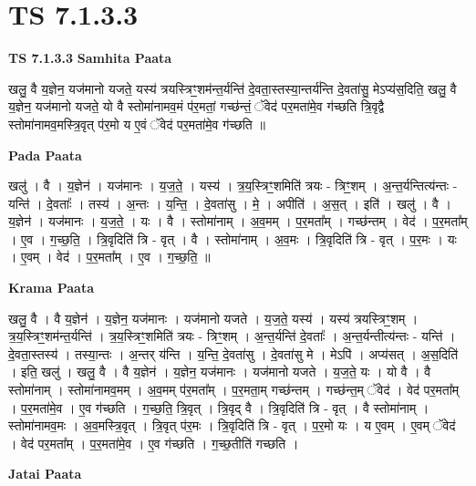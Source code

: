 \documentclass[17pt]{extarticle}
\begin{document}
\section{ TS 7.1.3.3 }

\textbf{TS 7.1.3.3 } \newline
\textbf{Samhita Paata} \newline

खलु॒ वै य॒ज्ञेन॒ यज॑मानो यजते॒ यस्य॑ त्रयस्त्रिꣳ॒॒शम॑न्त॒र्यन्ति॑ दे॒वता॒स्तस्या॒न्तर्य॑न्ति दे॒वता॑सु॒ मेऽप्य॑स॒दिति॒ खलु॒ वै य॒ज्ञेन॒ यज॑मानो यजते॒ यो वै स्तोमा॑नामव॒मं प॑र॒मतां॒ गच्छ॑न्तं॒ ॅवेद॑ पर॒मता॑मे॒व ग॑च्छति त्रि॒वृद्वै स्तोमा॑नामव॒मस्त्रि॒वृत् प॑र॒मो य ए॒वं ॅवेद॑ पर॒मता॑मे॒व ग॑च्छति ॥ \newline

\textbf{Pada Paata} \newline

खलु॑ । वै । य॒ज्ञेन॑ । यज॑मानः । य॒ज॒ते॒ । यस्य॑ । त्र॒य॒स्त्रिꣳ॒॒शमिति॑ त्रयः - त्रिꣳ॒॒शम् । अ॒न्त॒र्यन्तित्य॑न्तः - यन्ति॑ । दे॒वताः᳚ । तस्य॑ । अ॒न्तः । य॒न्ति॒ । दे॒वता॑सु । मे॒ । अपीति॑ । अ॒स॒त् । इति॑ । खलु॑ । वै । य॒ज्ञेन॑ । यज॑मानः । य॒ज॒ते॒ । यः । वै । स्तोमा॑नाम् । अ॒व॒मम् । प॒र॒मता᳚म् । गच्छ॑न्तम् । वेद॑ । प॒र॒मता᳚म् । ए॒व । ग॒च्छ॒ति॒ । त्रि॒वृदिति॑ त्रि - वृत् । वै । स्तोमा॑नाम् । अ॒व॒मः । त्रि॒वृदिति॑ त्रि - वृत् । प॒र॒मः । यः । ए॒वम् । वेद॑ । प॒र॒मता᳚म् । ए॒व । ग॒च्छ॒ति॒ ॥  \newline


\textbf{Krama Paata} \newline

खलु॒ वै । वै य॒ज्ञेन॑ । य॒ज्ञेन॒ यज॑मानः । यज॑मानो यजते । य॒ज॒ते॒ यस्य॑ । यस्य॑ त्रयस्त्रिꣳ॒॒शम् । त्र॒य॒स्त्रिꣳ॒॒शम॑न्त॒र्यन्ति॑ । त्र॒य॒स्त्रिꣳ॒॒शमिति॑ त्रयः - त्रिꣳ॒॒शम् । अ॒न्त॒र्यन्ति॑ दे॒वताः᳚ । अ॒न्त॒र्यन्तीत्य॑न्तः - यन्ति॑ । दे॒वता॒स्तस्य॑ । तस्या॒न्तः । अ॒न्तर् य॑न्ति । य॒न्ति॒ दे॒वता॑सु । दे॒वता॑सु मे । मेऽपि॑ । अप्य॑सत् । अ॒स॒दिति॑ । इति॒ खलु॑ । खलु॒ वै । वै य॒ज्ञेन॑ । य॒ज्ञेन॒ यज॑मानः । यज॑मानो यजते । य॒ज॒ते॒ यः । यो वै । वै स्तोमा॑नाम् । स्तोमा॑नामव॒मम् । अ॒व॒मम् प॑र॒मता᳚म् । प॒र॒मता॒म् गच्छ॑न्तम् । गच्छ॑न्त॒म् ॅवेद॑ । वेद॑ पर॒मता᳚म् । प॒र॒मता॑मे॒व । ए॒व ग॑च्छति । ग॒च्छ॒ति॒ त्रि॒वृत् । त्रि॒वृद् वै । त्रि॒वृदिति॑ त्रि - वृत् । वै स्तोमा॑नाम् । स्तोमा॑नामव॒मः । अ॒व॒मस्त्रि॒वृत् । त्रि॒वृत् प॑र॒मः । त्रि॒वृदिति॑ त्रि - वृत् । प॒र॒मो यः । य ए॒वम् । ए॒वम् ॅवेद॑ । वेद॑ पर॒मता᳚म् । प॒र॒मता॑मे॒व । ए॒व ग॑च्छति । ग॒च्छ॒तीति॑ गच्छति । \newline

\textbf{Jatai Paata} \newline
\end{document}
